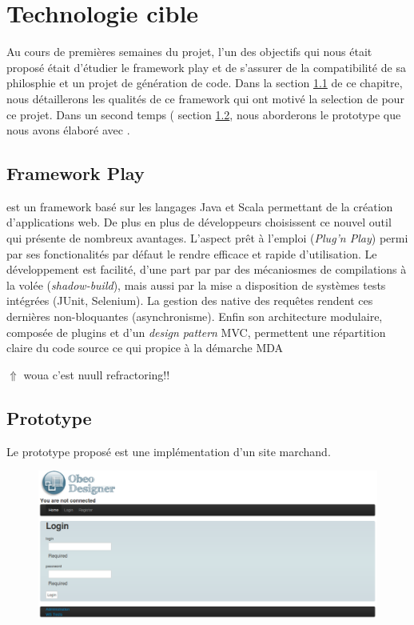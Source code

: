 \chapter{Technologie cible}\label{chap:Intro}
Au cours de premières semaines du projet, l'un des objectifs qui nous était proposé était d'étudier le framework play et de s'assurer de la compatibilité de sa philosphie et un projet de génération de code. Dans la section \ref{sec:pla} de ce chapitre, nous détaillerons les qualités de ce framework qui ont motivé la selection de \play{} pour ce projet. Dans un second temps (\cf{} section \ref{sec:pro}, nous aborderons le prototype que nous avons élaboré avec \play. 


\section{Framework Play}\label{sec:pla}
\play{} est un framework basé sur les langages Java et Scala permettant de la création d'applications web. De plus en plus de développeurs choisissent ce nouvel outil qui présente de nombreux avantages. L'aspect \og prêt à l'emploi \fg{} (\textit{Plug'n Play}) permi par ses fonctionalités par défaut le rendre efficace et rapide d'utilisation. Le développement est facilité, d'une part par par des mécaniosmes de compilations à la volée (\textit{shadow-build}), mais aussi par la mise a disposition de systèmes tests intégrées (JUnit, Selenium). La gestion des native des requêtes rendent ces dernières non-bloquantes (asynchronisme). Enfin son architecture modulaire, composée de plugins et d'un \textit{design pattern} MVC, permettent une répartition claire du code source ce qui propice à la démarche MDA

{\huge $\Uparrow$ woua c'est nuull refractoring!!}


\section{Prototype}\label{sec:pro}
Le prototype proposé est une implémentation d'un site marchand. 

\begin{figure}[htb]
  \centering
  \includegraphics[scale=.4]{img/proto.eps}
  \label{Prototype Play_Shop }
  \label{fig:pro}
\end{figure}

